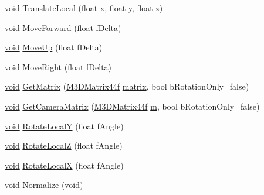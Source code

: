 \begin{DoxyCompactItemize}
\item 
\hyperlink{_s_d_l__opengl_8h_a3db05964a3cc4410f35b7ea2b7eb850d}{void} \hyperlink{class_g_l_frame_a647acfb8ae0f3014ccb76c07efb31e06}{Translate\-Local} (float \hyperlink{_g_l_e_w_2glew_8h_a0cdec8e97a75ee9458b23d152bf962d4}{x}, float \hyperlink{_g_l_e_w_2glew_8h_a74d80fd479c0f6d0153c709949a089ef}{y}, float \hyperlink{_g_l_e_w_2glew_8h_aee38b51639b577753f6a92029fb92000}{z})
\item 
\hyperlink{_s_d_l__opengl_8h_a3db05964a3cc4410f35b7ea2b7eb850d}{void} \hyperlink{class_g_l_frame_a3c8e2b21ecb339666c57f538b48e0fd5}{Move\-Forward} (float f\-Delta)
\item 
\hyperlink{_s_d_l__opengl_8h_a3db05964a3cc4410f35b7ea2b7eb850d}{void} \hyperlink{class_g_l_frame_aecf6747082b819c41214cba57eba4de5}{Move\-Up} (float f\-Delta)
\item 
\hyperlink{_s_d_l__opengl_8h_a3db05964a3cc4410f35b7ea2b7eb850d}{void} \hyperlink{class_g_l_frame_a2983e58a1d85f46de732561db26d5b14}{Move\-Right} (float f\-Delta)
\item 
\hyperlink{_s_d_l__opengl_8h_a3db05964a3cc4410f35b7ea2b7eb850d}{void} \hyperlink{class_g_l_frame_ad30ff15e4bdf565c7187f46f4509bd7a}{Get\-Matrix} (\hyperlink{math3d_8h_a1e8690467d81d5ed97c5ecc3a144a4ac}{M3\-D\-Matrix44f} \hyperlink{_g_l_e_w_2glew_8h_a7b24a3f2f56eb1244ae69dacb4fecb6f}{matrix}, bool b\-Rotation\-Only=false)
\item 
\hyperlink{_s_d_l__opengl_8h_a3db05964a3cc4410f35b7ea2b7eb850d}{void} \hyperlink{class_g_l_frame_adb6b98d80c16dc528fdb04adbb564ee4}{Get\-Camera\-Matrix} (\hyperlink{math3d_8h_a1e8690467d81d5ed97c5ecc3a144a4ac}{M3\-D\-Matrix44f} \hyperlink{_g_l_e_w_2glew_8h_af593500c283bf1a787a6f947f503a5c2}{m}, bool b\-Rotation\-Only=false)
\item 
\hyperlink{_s_d_l__opengl_8h_a3db05964a3cc4410f35b7ea2b7eb850d}{void} \hyperlink{class_g_l_frame_a2accebbe46bfe2275ba645ef06be2ada}{Rotate\-Local\-Y} (float f\-Angle)
\item 
\hyperlink{_s_d_l__opengl_8h_a3db05964a3cc4410f35b7ea2b7eb850d}{void} \hyperlink{class_g_l_frame_a4b83ae4cac630850ec0964dd8317ec23}{Rotate\-Local\-Z} (float f\-Angle)
\item 
\hyperlink{_s_d_l__opengl_8h_a3db05964a3cc4410f35b7ea2b7eb850d}{void} \hyperlink{class_g_l_frame_ad34801737bb76b685ee44959508091d7}{Rotate\-Local\-X} (float f\-Angle)
\item 
\hyperlink{_s_d_l__opengl_8h_a3db05964a3cc4410f35b7ea2b7eb850d}{void} \hyperlink{class_g_l_frame_a7643ddd16c84178ff0cf6014a3845a6b}{Normalize} (\hyperlink{_s_d_l__opengl_8h_a3db05964a3cc4410f35b7ea2b7eb850d}{void})

\end{DoxyCompactItemize}
